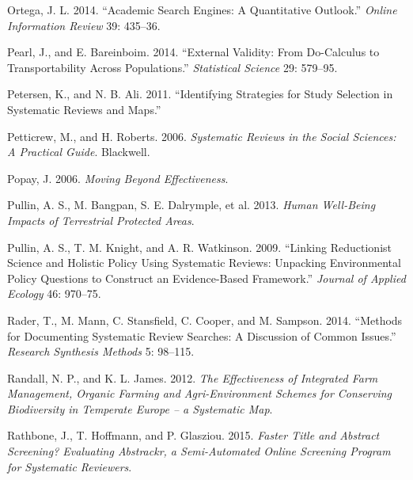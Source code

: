 \documentclass[
  letterpaper,
  DIV=11,
  numbers=noendperiod]{scrreprt}
\newlength{\cslhangindent}
\newenvironment{CSLReferences}[2] %
 {\begin{list}{}{%
  \setlength{\itemindent}{0pt}
  \setlength{\leftmargin}{0pt}
  \setlength{\parsep}{0pt}
  \ifodd #1
   \setlength{\leftmargin}{\cslhangindent}
   \setlength{\itemindent}{-1\cslhangindent}
  \fi
  \setlength{\itemsep}{#2\baselineskip}}}
 {\end{list}}
\begin{document}
\begin{CSLReferences}{1}{1}
Ortega, J. L. 2014. {``Academic Search Engines: A Quantitative
Outlook.''} \emph{Online Information Review} 39: 435--36.

Pearl, J., and E. Bareinboim. 2014. {``External Validity: From
Do-Calculus to Transportability Across Populations.''} \emph{Statistical
Science} 29: 579--95.

Petersen, K., and N. B. Ali. 2011. {``Identifying Strategies for Study
Selection in Systematic Reviews and Maps.''}

Petticrew, M., and H. Roberts. 2006. \emph{Systematic Reviews in the
Social Sciences: A Practical Guide}. Blackwell.

Popay, J. 2006. \emph{Moving Beyond Effectiveness}.

Pullin, A. S., M. Bangpan, S. E. Dalrymple, et al. 2013. \emph{Human
Well-Being Impacts of Terrestrial Protected Areas}.

Pullin, A. S., T. M. Knight, and A. R. Watkinson. 2009. {``Linking
Reductionist Science and Holistic Policy Using Systematic Reviews:
Unpacking Environmental Policy Questions to Construct an Evidence-Based
Framework.''} \emph{Journal of Applied Ecology} 46: 970--75.

Rader, T., M. Mann, C. Stansfield, C. Cooper, and M. Sampson. 2014.
{``Methods for Documenting Systematic Review Searches: A Discussion of
Common Issues.''} \emph{Research Synthesis Methods} 5: 98--115.

Randall, N. P., and K. L. James. 2012. \emph{The Effectiveness of
Integrated Farm Management, Organic Farming and Agri-Environment Schemes
for Conserving Biodiversity in Temperate Europe -- a Systematic Map}.

Rathbone, J., T. Hoffmann, and P. Glasziou. 2015. \emph{Faster Title and
Abstract Screening? Evaluating Abstrackr, a Semi-Automated Online
Screening Program for Systematic Reviewers}.


\end{CSLReferences}
\end{document}
